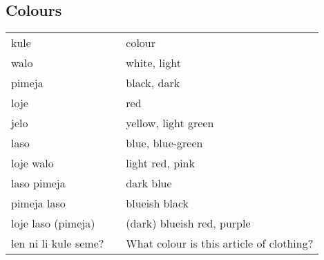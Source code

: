 \subsection{Colours}
%
\begin{supertabular}{p{4,5cm}|ll}
    kule                 &  & colour                                   \\
    walo                 &  & white, light                             \\
    pimeja               &  & black, dark                              \\
    loje                 &  & red                                      \\
    jelo                 &  & yellow, light green                      \\
    laso                 &  & blue, blue-green                         \\
    loje walo            &  & light red, pink                          \\
    laso pimeja          &  & dark blue                                \\
    pimeja laso          &  & blueish black                            \\
    loje laso (pimeja)   &  & (dark) blueish red, purple               \\
    len ni li kule seme? &  & What colour is this article of clothing? \\
\end{supertabular} \\
%
%
%
%
%
